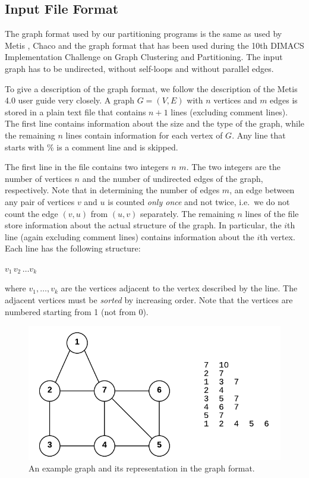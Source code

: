 \documentclass[11pt]{article}
\newcommand{\ie}{i.e.\ }
\begin{document}
\subsection{Input File Format}
The graph format used by our partitioning programs is the same as used by Metis \cite{karypis1998fast}, Chaco \cite{chaco} and the graph format that has been used during the 10th DIMACS Implementation Challenge on Graph Clustering and Partitioning. 
The input graph has to be undirected, without self-loops and without parallel edges.

To give a description of the graph format, we follow the description of the Metis 4.0 user guide very closely. A graph $G=(V,E)$ with $n$ vertices and $m$ edges is stored in a plain text file that contains $n+1$ lines (excluding comment lines). The first line contains information about the size and the type of the graph, while the remaining $n$ lines contain information for each vertex of $G$. Any line that starts with \% is a comment line and is skipped.

The first line in the file contains two integers $n$ $m$. The two integers are the number of vertices $n$ and the number of undirected edges of the graph, respectively. Note that in determining the number of edges $m$, an edge between any pair of vertices $v$ and $u$ is counted \emph{only once} and not twice, \ie we do not count the edge $(v,u)$ from $(u,v)$ separately. 
The remaining $n$ lines of the file store information about the actual structure of the graph. In particular, the $i$th line (again excluding comment lines) contains information about the $i$th vertex.
Each line has the following structure:
\begin{center}
       $v_1\, v_2\,  \ldots v_k$ 
\end{center}
where $v_1, \ldots, v_k$ are the vertices adjacent to the vertex described by the line. 
The adjacent vertices must be \emph{sorted} by increasing order.
Note that the vertices are numbered starting from 1 (not from 0). 

\begin{figure}[b]
\centering
\includegraphics[scale=0.7]{input_format.pdf}
\caption{An example graph and its representation in the graph format.}
\label{fig:inputformat}
\end{figure}
\end{document}
